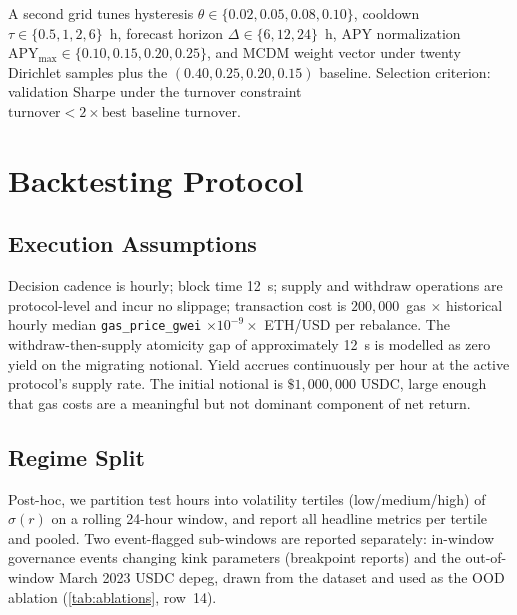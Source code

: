 \documentclass[11pt,a4paper]{article}
\begin{document}
A second grid tunes hysteresis $\theta\in\{0.02,0.05,0.08,0.10\}$,
cooldown $\tau\in\{0.5,1,2,6\}$~h, forecast horizon
$\Delta\in\{6,12,24\}$~h, APY normalization
$\mathrm{APY}_{\max}\in\{0.10,0.15,0.20,0.25\}$, and MCDM weight
vector under twenty Dirichlet samples plus the
$(0.40,0.25,0.20,0.15)$ baseline. Selection criterion: validation
Sharpe under the turnover constraint
$\text{turnover} < 2\times\text{best baseline turnover}$.

\section{Backtesting Protocol}
\label{sec:backtest}

\subsection{Execution Assumptions}
\label{sec:exec}

Decision cadence is hourly; block time 12~s; supply and withdraw
operations are protocol-level and incur no slippage; transaction cost
is $200{,}000$~gas $\times$ historical hourly median
\texttt{gas\_price\_gwei} $\times 10^{-9}\times$ ETH/USD per rebalance.
The withdraw-then-supply atomicity gap of approximately 12~s is
modelled as zero yield on the migrating notional. Yield accrues
continuously per hour at the active protocol's supply rate. The
initial notional is $\$1{,}000{,}000$ USDC, large enough that gas
costs are a meaningful but not dominant component of net return.

\subsection{Regime Split}
\label{sec:regime}

Post-hoc, we partition test hours into volatility tertiles
(low/medium/high) of $\sigma(r)$ on a rolling 24-hour window, and
report all headline metrics per tertile and pooled. Two event-flagged
sub-windows are reported separately: in-window governance events
changing kink parameters (breakpoint reports) and the out-of-window
March 2023 USDC depeg, drawn from the
\cite{rules2rewards2025} dataset and used as the OOD ablation
(\cref{tab:ablations}, row~14).


\end{document}
